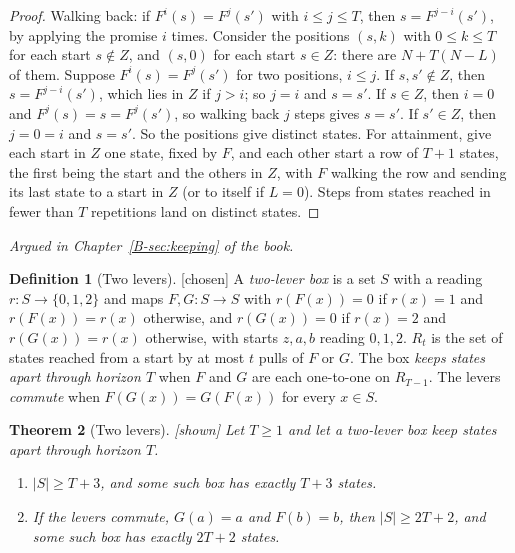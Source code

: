 \documentclass[11pt, a4paper]{article}
\theoremstyle{plain}
\newtheorem{theorem}{Theorem}[section]
\theoremstyle{definition}
\newtheorem{definition}[theorem]{Definition}
\theoremstyle{remark}
\newcommand{\rd}{r}
\newcommand{\argued}[1]{\par\noindent\textit{Argued in Chapter~\ref{B-#1} of the book.}\par}
\newcommand{\kind}[1]{\textup{[#1]}}
\begin{document}
\begin{proof}
Walking back: if $F^i(s)=F^j(s')$ with $i\le j\le T$, then $s=F^{j-i}(s')$, by applying the promise $i$
times. Consider the positions $(s,k)$ with $0\le k\le T$ for each start $s\notin Z$, and $(s,0)$ for each start
$s\in Z$: there are $N+T(N-L)$ of them. Suppose $F^i(s)=F^j(s')$ for two positions, $i\le j$. If $s,s'\notin Z$,
then $s=F^{j-i}(s')$, which lies in $Z$ if $j>i$; so $j=i$ and $s=s'$. If $s\in Z$, then $i=0$ and
$F^j(s)=s=F^j(s')$, so walking back $j$ steps gives $s=s'$. If $s'\in Z$, then $j=0=i$ and $s=s'$. So the
positions give distinct states. For attainment, give each start in $Z$ one state, fixed by $F$, and each other
start a row of $T+1$ states, the first being the start and the others in $Z$, with $F$ walking the row and
sending its last state to a start in $Z$ (or to itself if $L=0$). Steps from states reached in fewer than $T$
repetitions land on distinct states.
\end{proof}

\argued{sec:keeping}

\begin{definition}[Two levers]\label{spec:levers-def} \kind{chosen}
A \emph{two-lever box} is a set $S$ with a reading $\rd:S\to\{0,1,2\}$ and maps $F,G:S\to S$ with
$\rd(F(x))=0$ if $\rd(x)=1$ and $\rd(F(x))=\rd(x)$ otherwise, and $\rd(G(x))=0$ if $\rd(x)=2$ and
$\rd(G(x))=\rd(x)$ otherwise, with starts $z,a,b$ reading $0,1,2$. $R_t$ is the set of states reached from a
start by at most $t$ pulls of $F$ or $G$. The box \emph{keeps states apart through horizon $T$} when $F$ and
$G$ are each one-to-one on $R_{T-1}$. The levers \emph{commute} when $F(G(x))=G(F(x))$ for every $x\in S$.
\end{definition}

\begin{theorem}[Two levers]\label{spec:levers} \kind{shown}
Let $T\ge1$ and let a two-lever box keep states apart through horizon $T$.
\begin{enumerate}[label=(\alph*)]
\item $|S|\ge T+3$, and some such box has exactly $T+3$ states.
\item If the levers commute, $G(a)=a$ and $F(b)=b$, then $|S|\ge2T+2$, and some such box has exactly
$2T+2$ states.
\end{enumerate}
\end{theorem}
\end{document}
